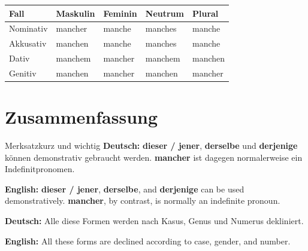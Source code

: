 \documentclass[a4paper,11pt]{article}
\newcommand{\GermanText}[1]{\textbf{Deutsch: }#1\par}
\newcommand{\EnglishText}[1]{{\small\color{SoftGray}\textbf{English: }#1\par}}
\newcommand{\HeaderRow}{\rowcolor{HeaderBlueDark}\color{white}\bfseries Fall & \color{white}\bfseries Maskulin & \color{white}\bfseries Feminin & \color{white}\bfseries Neutrum & \color{white}\bfseries Plural \\}
\begin{document}
\begin{center}
\begin{tabular}{|>{\centering\arraybackslash}m{2.2cm}|>{\centering\arraybackslash}m{2.5cm}|>{\centering\arraybackslash}m{2.5cm}|>{\centering\arraybackslash}m{2.5cm}|>{\centering\arraybackslash}m{2.5cm}|}
\hline
\HeaderRow
\hline
\rowcolor{RowBlueLight}Nominativ & mancher & manche & manches & manche \\
\hline
\rowcolor{RowBlueDark}Akkusativ & manchen & manche & manches & manche \\
\hline
\rowcolor{RowBlueLight}Dativ & manchem & mancher & manchem & manchen \\
\hline
\rowcolor{RowBlueDark}Genitiv & manchen & mancher & manchen & mancher \\
\hline
\end{tabular}
\end{center}

\section{Zusammenfassung}
\begin{grammarentry}{Merksatz}{kurz und wichtig}
\GermanText{\textbf{dieser / jener}, \textbf{derselbe} und \textbf{derjenige} können demonstrativ gebraucht werden. \textbf{mancher} ist dagegen normalerweise ein Indefinitpronomen.}
\EnglishText{\textbf{dieser / jener}, \textbf{derselbe}, and \textbf{derjenige} can be used demonstratively. \textbf{mancher}, by contrast, is normally an indefinite pronoun.}
\GermanText{Alle diese Formen werden nach Kasus, Genus und Numerus dekliniert.}
\EnglishText{All these forms are declined according to case, gender, and number.}
\end{grammarentry}
\end{document}
